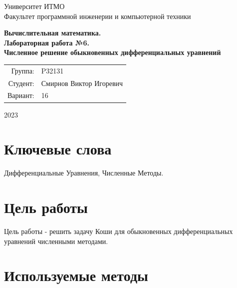 \documentclass{article}
\begin{document}
\begin{titlepage}
    \begin{center}
        \begin{spacing}{1.4}
            \large{Университет ИТМО} \\
            \large{Факультет программной инженерии и компьютерной техники} \\
        \end{spacing}
        \vfill
        \textbf{
            \huge{Вычислительная математика.} \\
            \huge{Лабораторная работа №6.} \\
            \huge{
                Численное решение обыкновенных
                дифференциальных уравнений
            } \\
        }
    \end{center}
    \vfill
    \begin{center}
        \begin{tabular}{r l}
            Группа:  & P32131                  \\
            Студент: & Смирнов Виктор Игоревич \\
            Вариант: & 16                      \\
        \end{tabular}
    \end{center}
    \vfill
    \begin{center}
        \begin{large}
            2023
        \end{large}
    \end{center}
\end{titlepage}

\section*{Ключевые слова}
Дифференциальные Уравнения, Численные Методы.

\tableofcontents

\section{Цель работы}

Цель работы - решить задачу Коши для обыкновенных
дифференциальных уравнений численными методами.

\section{Используемые методы}
\end{document}
